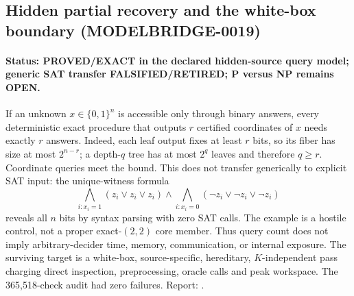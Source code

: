 \subsection{Hidden partial recovery and the white-box boundary (MODELBRIDGE-0019)}
\paragraph{Status: PROVED/EXACT in the declared hidden-source query model; generic SAT transfer FALSIFIED/RETIRED; P versus NP remains OPEN.}
If an unknown $x\in\{0,1\}^n$ is accessible only through binary answers, every deterministic exact procedure that outputs $r$ certified coordinates of $x$ needs exactly $r$ answers.  Indeed, each leaf output fixes at least $r$ bits, so its fiber has size at most $2^{n-r}$; a depth-$q$ tree has at most $2^q$ leaves and therefore $q\ge r$.  Coordinate queries meet the bound.  This does not transfer generically to explicit SAT input: the unique-witness formula
\[
\bigwedge_{i:x_i=1}(z_i\vee z_i\vee z_i)\wedge
\bigwedge_{i:x_i=0}(\neg z_i\vee\neg z_i\vee\neg z_i)
\]
reveals all $n$ bits by syntax parsing with zero SAT calls.  The example is a hostile control, not a proper exact-$(2,2)$ core member.  Thus query count does not imply arbitrary-decider time, memory, communication, or internal exposure.  The surviving target is a white-box, source-specific, hereditary, $K$-independent pass charging direct inspection, preprocessing, oracle calls and peak workspace.  The 365,518-check audit had zero failures.  Report: .
